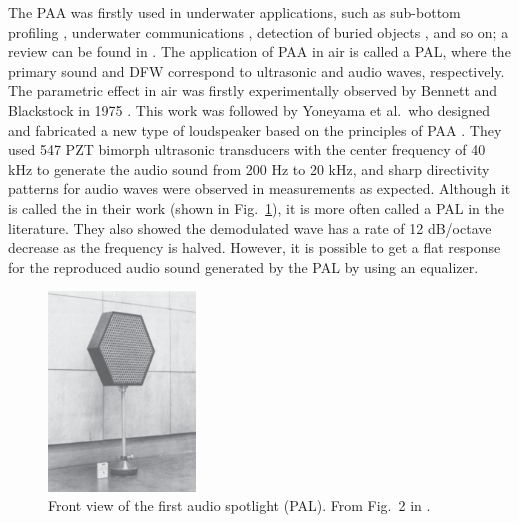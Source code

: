 The PAA was firstly used in underwater applications, such as sub-bottom profiling \cite{Humphrey2008AcousticCharacterizationPanel, Qu2018ExperimentalStudyBroadband}, underwater communications \cite{Wiedmann2012ParametricUnderwaterCommunications}, detection of buried objects \cite{Trucco2000AcousticDetectionObjects}, and so on; a review can be found in \cite{Zhou2020ParametricAcousticArray}.
The application of PAA in air is called {a} PAL, where the primary sound and DFW correspond to ultrasonic and audio waves, respectively.
The parametric effect in air was firstly experimentally observed by Bennett and Blackstock in 1975 \cite{Bennett1975ParametricArrayAir}.
{This work was followed by Yoneyama et al.\ who} designed and fabricated a new type of loudspeaker based on {the principles of PAA} \cite{Yoneyama1983AudioSpotlightApplication}.
{
    They used 547 PZT bimorph ultrasonic transducers with the center frequency of 40 kHz to generate the audio sound from 200 Hz to 20 kHz, and sharp directivity patterns for audio waves were observed in measurements as expected. 
}
Although it is called the  in their work (shown in Fig.~\ref{fig:298jfjdsjdjfj}), it is more often called a PAL in {the literature}. 
They also showed the demodulated wave has a rate of 12 dB/octave decrease as the frequency is halved. 
However, it is possible to get a flat response for the reproduced audio sound generated by the PAL by using an equalizer. 

\begin{figure}[!htb]
    \centering
    \includegraphics[width = 0.35\textwidth]{fig/yoneyama1983_audio_spotlight_resize.png}
    \caption{Front view of the first audio spotlight (PAL). From Fig.~2 in \cite{Yoneyama1983AudioSpotlightApplication}.}
    \label{fig:298jfjdsjdjfj}
\end{figure}


